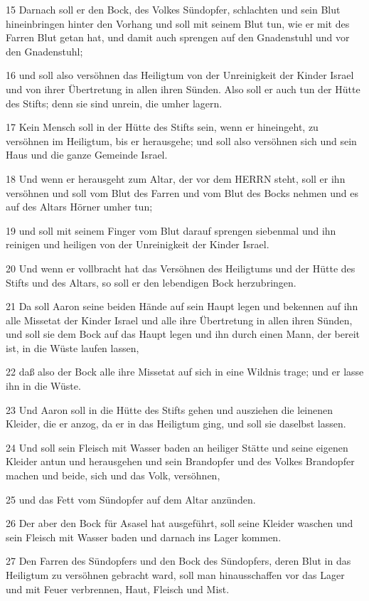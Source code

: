 \par 15 Darnach soll er den Bock, des Volkes Sündopfer, schlachten und sein Blut hineinbringen hinter den Vorhang und soll mit seinem Blut tun, wie er mit des Farren Blut getan hat, und damit auch sprengen auf den Gnadenstuhl und vor den Gnadenstuhl;
\par 16 und soll also versöhnen das Heiligtum von der Unreinigkeit der Kinder Israel und von ihrer Übertretung in allen ihren Sünden. Also soll er auch tun der Hütte des Stifts; denn sie sind unrein, die umher lagern.
\par 17 Kein Mensch soll in der Hütte des Stifts sein, wenn er hineingeht, zu versöhnen im Heiligtum, bis er herausgehe; und soll also versöhnen sich und sein Haus und die ganze Gemeinde Israel.
\par 18 Und wenn er herausgeht zum Altar, der vor dem HERRN steht, soll er ihn versöhnen und soll vom Blut des Farren und vom Blut des Bocks nehmen und es auf des Altars Hörner umher tun;
\par 19 und soll mit seinem Finger vom Blut darauf sprengen siebenmal und ihn reinigen und heiligen von der Unreinigkeit der Kinder Israel.
\par 20 Und wenn er vollbracht hat das Versöhnen des Heiligtums und der Hütte des Stifts und des Altars, so soll er den lebendigen Bock herzubringen.
\par 21 Da soll Aaron seine beiden Hände auf sein Haupt legen und bekennen auf ihn alle Missetat der Kinder Israel und alle ihre Übertretung in allen ihren Sünden, und soll sie dem Bock auf das Haupt legen und ihn durch einen Mann, der bereit ist, in die Wüste laufen lassen,
\par 22 daß also der Bock alle ihre Missetat auf sich in eine Wildnis trage; und er lasse ihn in die Wüste.
\par 23 Und Aaron soll in die Hütte des Stifts gehen und ausziehen die leinenen Kleider, die er anzog, da er in das Heiligtum ging, und soll sie daselbst lassen.
\par 24 Und soll sein Fleisch mit Wasser baden an heiliger Stätte und seine eigenen Kleider antun und herausgehen und sein Brandopfer und des Volkes Brandopfer machen und beide, sich und das Volk, versöhnen,
\par 25 und das Fett vom Sündopfer auf dem Altar anzünden.
\par 26 Der aber den Bock für Asasel hat ausgeführt, soll seine Kleider waschen und sein Fleisch mit Wasser baden und darnach ins Lager kommen.
\par 27 Den Farren des Sündopfers und den Bock des Sündopfers, deren Blut in das Heiligtum zu versöhnen gebracht ward, soll man hinausschaffen vor das Lager und mit Feuer verbrennen, Haut, Fleisch und Mist.
